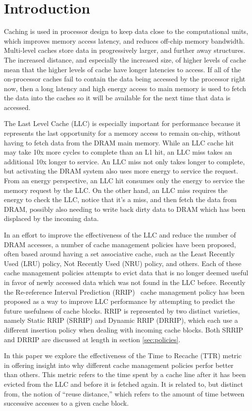 \section{Introduction}

Caching is used in processor design to keep data close to the
computational units, which improves memory access latency, and reduces
off-chip memory bandwidth.  Multi-level
caches store data in progressively larger,
and further away structures.  The increased distance, and especially
the increased size, of higher levels of cache mean that the higher
levels of cache have longer latencies to access.  If all of the
on-processor caches fail to contain the data being accessed by the
processor right now, then a long latency and high energy access to
main memory is used to fetch the data into the caches so it will be
available for the next time that data is accessed.

The Last Level Cache (LLC) is especially important for performance
because it represents the last opportunity for a memory access to
remain on-chip, without having to fetch data from the DRAM main
memory.  While an LLC cache hit may take 10x more cycles to complete
than an L1 hit, an LLC miss takes an additional 10x longer to
service.  An LLC miss not only takes longer to complete, but
activating the
DRAM system also uses more energy to service the request.  From an
energy perspective, an LLC hit consumes only the energy to service the
memory request by the LLC.  On the other hand, an LLC miss requires
the energy to
check the LLC, notice that it's a miss, and then fetch the data from
DRAM, possibly also needing to write back dirty data to DRAM which has
been
displaced by the incoming data. 

In an effort to improve the effectiveness of the LLC and reduce the
number of DRAM accesses, a number of cache management policies have
been proposed, often based around having a set associative cache, such
as the Least Recently Used (LRU) policy, Not Recently Used
(NRU) policy, and others.  Each of these cache management policies
attempts to
evict data that is no longer deemed useful in favor of newly accessed
data which was not found in the LLC before.  Recently the
Re-reference Interval Prediction (RRIP)~\cite{jaleeltheobald10} cache
management policy has
been proposed as a way to improve LLC performance by attempting to
predict the future usefulness of cache blocks.  RRIP is represented by
two distinct varieties, namely Static RRIP (SRRIP) and Dynamic RRIP
(DRRIP), which
each use a different insertion policy when dealing with incoming
cache blocks.  Both SRRIP and DRRIP are discussed at length in section
\ref{sec:policies}.

In this paper we explore the effectiveness of the Time to Recache
(TTR) metric in offering insight into why different cache management
policies perfor better than others.  This metric refers
to the time spent by a cache line after it has been evicted from the
LLC and before it is fetched again.  It is related to, but distinct
from, the notion of ``reuse distance,'' which refers to the amount of
time between successive accesses to a given cache block.
